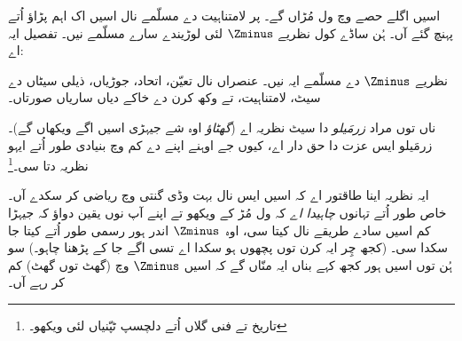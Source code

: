 \documentclass[../../../include/open-logic-section]{subfiles}
\begin{document}

اسیں اگلے حصے وچ \stagesinf{} ول مُڑاں گے۔ پر لامتناہیت دے مسلّمے
نال اسیں اک اہم پڑاؤ اُتے پہنچ گئے آں۔ ہُن ساڈے کول نظریے $ \Zminus$
لئی لوڑیندے سارے مسلّمے نیں۔ تفصیل ایہ اے:

\begin{defn}
نظریے $ \Zminus$ دے مسلّمے ایہ نیں۔ عنصراں نال تعیّن، اتحاد، جوڑیاں،
ذیلی سیٹاں دے سیٹ، لامتناہیت، تے وکھ کرن دے خاکے دیاں ساریاں صورتاں۔
\end{defn}

ناں توں مراد \emph{زرمَیلو} دا سیٹ نظریہ اے (\emph{گھٹاؤ} اوہ شے
جیہڑی اسیں اگے ویکھاں گے)۔ زرمَیلو ایس عزت دا حق دار اے، کیوں جے اوہنے
اپنے \citeyear{Zermelo1908Untersuchungen} دے کم وچ بنیادی طور اُتے ایہو
نظریہ دتا سی۔\footnote{تاریخ تے فنی گلاں اُتے دلچسپ ٹپّنیاں لئی
\citet[Appendix
A]{Potter2004} ویکھو۔}

ایہ نظریہ اینا طاقتور اے کہ اسیں ایس نال بہت وڈی گنتی وچ ریاضی کر سکدے آں۔
خاص طور اُتے تہانوں \emph{چاہیدا اے} کہ  ول مُڑ کے
ویکھو تے اپنے آپ نوں یقین دواؤ کہ جیہڑا کم اسیں سادے طریقے نال کیتا سی،
اوہ~$\Zminus$ اندر ہور رسمی طور اُتے کیتا جا سکدا سی۔ (کجھ چِر ایہ
کرن توں پچھوں ہو سکدا اے تسی اگے جا کے 
پڑھنا چاہو۔) سو ہُن توں اسیں ہور کجھ کہے بناں ایہ منّاں گے کہ اسیں
$ \Zminus$ وچ (گھٹ توں گھٹ) کم کر رہے آں۔
\end{document}
